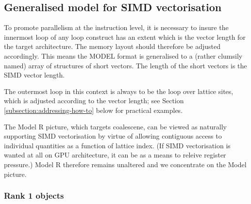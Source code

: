 \subsection{Generalised model for SIMD vectorisation}

To promote parallelism at the instruction level, it is necessary to
insure the innermost loop of any loop construct has an extent which
is the vector length for the target architecture. The memory layout
should therefore be adjusted accordingly. This means the MODEL format
is generalised to a (rather clumsily named) array of structures of
short vectors. The length of the short vectors is the SIMD vector
length.

The outermost loop in this context is always to be the loop over
lattice sites, which is adjusted according to the vector length;
see Section \ref{subsection:addressing-how-to} below for practical
examples.

The Model R picture, which targets coalescene, can be viewed as
naturally supporting SIMD vectorisation by virtue of allowing
contiguous access to individual quantities as a function of lattice
index. (If SIMD vectorisation is wanted at all on GPU architecture,
it can be as a means to releive register pressure.) Model R therefore
remains unaltered and we concentrate on the Model picture.

\subsubsection{Rank 1 objects}

